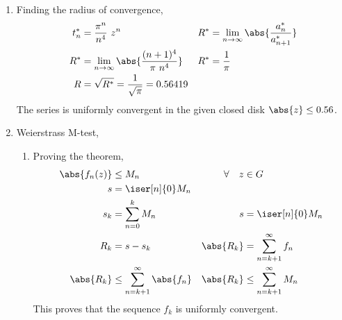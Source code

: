 \begin{enumerate}
    \item Finding the radius of convergence,
          \begin{align}
              t_n^* & = \frac{\pi^n}{n^4}\ z^n                              &
              R^*   & = \lim_{n \to \infty} \abs{\frac{a^*_{n}}{a^*_{n+1}}}   \\
              R^*   & = \lim_{n \to \infty} \abs{\frac{(n+1)^4}{\pi\ n^4}}  &
              R^*   & = \frac{1}{\pi}                                         \\
              R     & = \sqrt{R^*} = \frac{1}{\sqrt{\pi}} = 0.56419
          \end{align}
          The series \textcolor{y_h}{is uniformly convergent} in the given closed disk
          $ \abs{z} \leq 0.56 $.

    \item Weierstrass M-test,
          \begin{enumerate}
              \item Proving the theorem,
                    \begin{align}
                        \abs{f_n(z)}    & \leq M_n                             &
                        \forall \quad z & \in G                                  \\
                        s               & = \iser[n]{0} M_n                      \\
                        s_k             & = \sum_{n=0}^{k} M_n                 &
                        s               & = \iser[n]{0} M_n                      \\
                        R_k             & = s - s_k                            &
                        \abs{R_k}       & = \sum_{n=k+1}^{\infty} f_n            \\
                        \abs{R_k}       & \leq \sum_{n=k+1}^{\infty} \abs{f_n} &
                        \abs{R_k}       & \leq \sum_{n=k+1}^{\infty} M_n
                    \end{align}
                    This proves that the sequence $ f_k $ is uniformly convergent.


\end{enumerate}
\end{enumerate}
